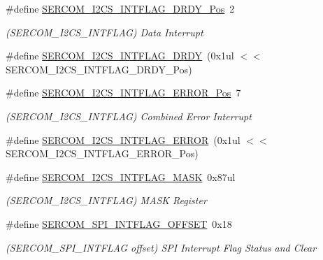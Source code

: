 \begin{DoxyCompactItemize}
\item 
\#define \mbox{\hyperlink{group___s_a_m_d21___s_e_r_c_o_m_ga76f9d08ad746835bfd7d95b5c1d78527}{S\+E\+R\+C\+O\+M\+\_\+\+I2\+C\+S\+\_\+\+I\+N\+T\+F\+L\+A\+G\+\_\+\+D\+R\+D\+Y\+\_\+\+Pos}}~2
\begin{DoxyCompactList}\small\item\em (S\+E\+R\+C\+O\+M\+\_\+\+I2\+C\+S\+\_\+\+I\+N\+T\+F\+L\+AG) Data Interrupt \end{DoxyCompactList}\item 
\#define \mbox{\hyperlink{group___s_a_m_d21___s_e_r_c_o_m_gad7c0df1a5fb8093b26af53565325cb2c}{S\+E\+R\+C\+O\+M\+\_\+\+I2\+C\+S\+\_\+\+I\+N\+T\+F\+L\+A\+G\+\_\+\+D\+R\+DY}}~(0x1ul $<$$<$ S\+E\+R\+C\+O\+M\+\_\+\+I2\+C\+S\+\_\+\+I\+N\+T\+F\+L\+A\+G\+\_\+\+D\+R\+D\+Y\+\_\+\+Pos)
\item 
\#define \mbox{\hyperlink{group___s_a_m_d21___s_e_r_c_o_m_ga283186c68358fd5c9c5fedd7d09456a5}{S\+E\+R\+C\+O\+M\+\_\+\+I2\+C\+S\+\_\+\+I\+N\+T\+F\+L\+A\+G\+\_\+\+E\+R\+R\+O\+R\+\_\+\+Pos}}~7
\begin{DoxyCompactList}\small\item\em (S\+E\+R\+C\+O\+M\+\_\+\+I2\+C\+S\+\_\+\+I\+N\+T\+F\+L\+AG) Combined Error Interrupt \end{DoxyCompactList}\item 
\#define \mbox{\hyperlink{group___s_a_m_d21___s_e_r_c_o_m_gade51d595b2e5da8425f67c1679cc24a0}{S\+E\+R\+C\+O\+M\+\_\+\+I2\+C\+S\+\_\+\+I\+N\+T\+F\+L\+A\+G\+\_\+\+E\+R\+R\+OR}}~(0x1ul $<$$<$ S\+E\+R\+C\+O\+M\+\_\+\+I2\+C\+S\+\_\+\+I\+N\+T\+F\+L\+A\+G\+\_\+\+E\+R\+R\+O\+R\+\_\+\+Pos)
\item 
\#define \mbox{\hyperlink{group___s_a_m_d21___s_e_r_c_o_m_ga8e225e237334deb769931e8f129e61fa}{S\+E\+R\+C\+O\+M\+\_\+\+I2\+C\+S\+\_\+\+I\+N\+T\+F\+L\+A\+G\+\_\+\+M\+A\+SK}}~0x87ul
\begin{DoxyCompactList}\small\item\em (S\+E\+R\+C\+O\+M\+\_\+\+I2\+C\+S\+\_\+\+I\+N\+T\+F\+L\+AG) M\+A\+SK Register \end{DoxyCompactList}\item 
\#define \mbox{\hyperlink{group___s_a_m_d21___s_e_r_c_o_m_ga9a541e90f6a7b20fefab55898955cf57}{S\+E\+R\+C\+O\+M\+\_\+\+S\+P\+I\+\_\+\+I\+N\+T\+F\+L\+A\+G\+\_\+\+O\+F\+F\+S\+ET}}~0x18
\begin{DoxyCompactList}\small\item\em (S\+E\+R\+C\+O\+M\+\_\+\+S\+P\+I\+\_\+\+I\+N\+T\+F\+L\+AG offset) S\+PI Interrupt Flag Status and Clear \end{DoxyCompactList}\item 

\end{DoxyCompactItemize}
